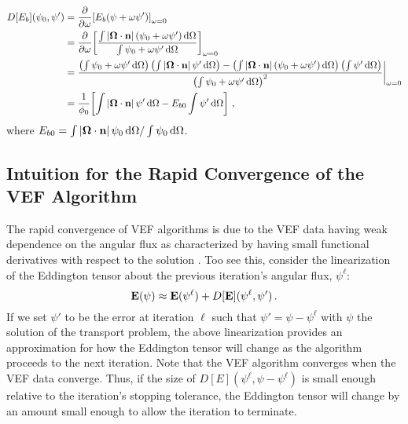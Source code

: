 \documentclass[../doc.tex]{subfiles}
\begin{document}
	\begin{equation} \label{vef:Eb_deriv}
	\begin{aligned}
		D[E_b](\psi_0,\psi') &= \pderiv{}{\omega}\bracket{E_b(\psi + \omega\psi')}_{\omega=0} \\ 
		&= \pderiv{}{\omega}\bracket{\frac{\int |\Omegahat\cdot\n|\paren{\psi_0 + \omega\psi'} \ud \Omega}{\int \psi_0 + \omega\psi' \ud \Omega}}_{\omega=0} \\
		&= \frac{\paren{\int \psi_0 + \omega\psi' \ud \Omega}\paren{\int |\Omegahat\cdot\n|\,\psi'\ud\Omega} - \paren{\int |\Omegahat\cdot\n|\paren{\psi_0 + \omega\psi'}\ud\Omega}\paren{\int\psi'\ud\Omega}}{\paren{\int \psi_0 + \omega\psi' \ud \Omega}^2} \biggr\rvert_{\omega=0} \\
		&= \frac{1}{\phi_0}\bracket{\int |\Omegahat\cdot\n|\,\psi' \ud \Omega - E_{b0} \int \psi' \ud \Omega} \,,
	\end{aligned}
	\end{equation}
where $E_{b0} = \int |\boldsymbol{\Omega}\cdot\boldsymbol{\mathrm{n}}|\,\psi_0 \mathop{}\!\mathrm{d} \Omega / \int \psi_0 \mathop{}\!\mathrm{d} \Omega$. 

\subsection{Intuition for the Rapid Convergence of the VEF Algorithm}
The rapid convergence of VEF algorithms is due to the VEF data having weak dependence on the angular flux as characterized by having small functional derivatives with respect to the solution \cite{goldin}. Too see this, consider the linearization of the Eddington tensor about the previous iteration's angular flux, $\psi^\ell$: 
	\begin{equation} \label{vef:edd_lin}
		\boldsymbol{\mathrm{E}}(\psi) \approx \boldsymbol{\mathrm{E}}(\psi^\ell) + D[\boldsymbol{\mathrm{E}}](\psi^\ell,\psi') \,. 
	\end{equation}
If we set $\psi'$ to be the error at iteration $\ell$ such that $\psi' = \psi - \psi^\ell$ with $\psi$ the solution of the transport problem, the above linearization provides an approximation for how the Eddington tensor will change as the algorithm proceeds to the next iteration. Note that the VEF algorithm converges when the VEF data converge. Thus, if the size of $D[E](\psi^\ell,\psi - \psi^\ell)$ is small enough relative to the iteration's stopping tolerance, the Eddington tensor will change by an amount small enough to allow the iteration to terminate. 
\end{document}
